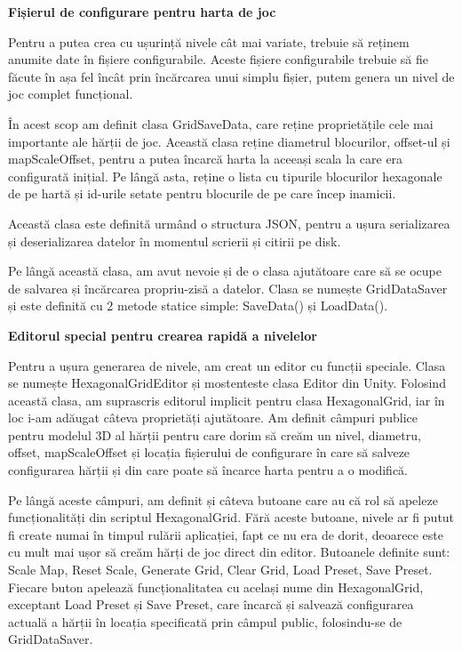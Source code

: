 \documentclass[12pt, a4paper]{article}
\begin{document}
	\textbf{Fișierul de configurare pentru harta de joc}
	
	Pentru a putea crea cu ușurință nivele cât mai variate, trebuie să reținem anumite date în fișiere configurabile. Aceste fișiere configurabile trebuie să fie făcute în așa fel încât prin încărcarea unui simplu fișier, putem genera un nivel de joc complet funcțional.
	\newline
	
	În acest scop am definit clasa GridSaveData, care reține proprietățile cele mai importante ale hărții de joc. Această clasa reține diametrul blocurilor, offset-ul și mapScaleOffset, pentru a putea încarcă harta la aceeași scala la care era configurată inițial. Pe lângă asta, reține o lista cu tipurile blocurilor hexagonale de pe hartă și id-urile setate pentru blocurile de pe care încep inamicii.
	\newline
	
	Această clasa este definită urmând o structura JSON, pentru a ușura serializarea și deserializarea datelor în momentul scrierii și citirii pe disk.
	\newline
	
	Pe lângă această clasa, am avut nevoie și de o clasa ajutătoare care să se ocupe de salvarea și încărcarea propriu-zisă a datelor. Clasa se numește GridDataSaver și este definită cu 2 metode statice simple: SaveData() și LoadData().
	\newline
	
	
	
	
	
	\textbf{Editorul special pentru crearea rapidă a nivelelor}
	
	Pentru a ușura generarea de nivele, am creat un editor cu funcții speciale. Clasa se numește HexagonalGridEditor și mostenteste clasa Editor din Unity. Folosind această clasa, am suprascris editorul implicit pentru clasa HexagonalGrid, iar în loc i-am adăugat câteva proprietăți ajutătoare. Am definit câmpuri publice pentru modelul 3D al hărții pentru care dorim să creăm un nivel, diametru, offset, mapScaleOffset și locația fișierului de configurare în care să salveze configurarea hărții și din care poate să încarce harta pentru a o modifică.
	\newline
	
	Pe lângă aceste câmpuri, am definit și câteva butoane care au că rol să apeleze funcționalități din scriptul HexagonalGrid. Fără aceste butoane, nivele ar fi putut fi create numai în timpul rulării aplicației, fapt ce nu era de dorit, deoarece este cu mult mai ușor să creăm hărți de joc direct din editor. Butoanele definite sunt: Scale Map, Reset Scale, Generate Grid, Clear Grid, Load Preset, Save Preset. Fiecare buton apelează funcționalitatea cu același nume din HexagonalGrid, exceptant Load Preset și Save Preset, care încarcă și salvează configurarea actuală a hărții în locația specificată prin câmpul public, folosindu-se de GridDataSaver.
	\newline
	
\end{document}

